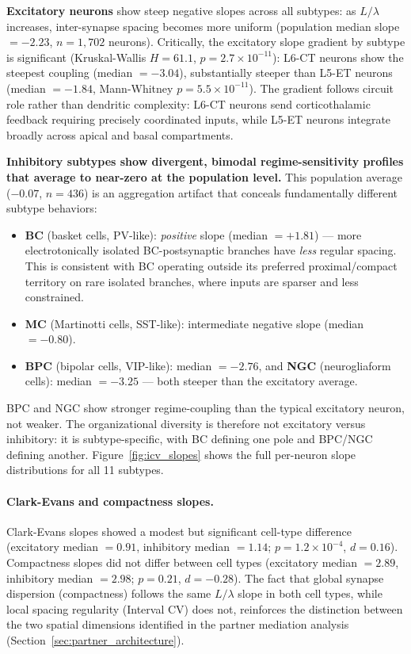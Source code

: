 \documentclass[11pt]{article}
\begin{document}
\textbf{Excitatory neurons} show steep negative slopes across all subtypes: as $L/\lambda$ increases, inter-synapse spacing becomes more uniform (population median slope $= -2.23$, $n = 1{,}702$ neurons). Critically, the excitatory slope gradient by subtype is significant (Kruskal-Wallis $H = 61.1$, $p = 2.7 \times 10^{-11}$): L6-CT neurons show the steepest coupling (median $= -3.04$), substantially steeper than L5-ET neurons (median $= -1.84$, Mann-Whitney $p = 5.5 \times 10^{-11}$). The gradient follows circuit role rather than dendritic complexity: L6-CT neurons send corticothalamic feedback requiring precisely coordinated inputs, while L5-ET neurons integrate broadly across apical and basal compartments.

\textbf{Inhibitory subtypes show divergent, bimodal regime-sensitivity profiles that average to near-zero at the population level.} This population average ($-0.07$, $n = 436$) is an aggregation artifact that conceals fundamentally different subtype behaviors:
\begin{itemize}
  \item \textbf{BC} (basket cells, PV-like): \textit{positive} slope (median $= +1.81$) --- more electrotonically isolated BC-postsynaptic branches have \textit{less} regular spacing. This is consistent with BC operating outside its preferred proximal/compact territory on rare isolated branches, where inputs are sparser and less constrained.
  \item \textbf{MC} (Martinotti cells, SST-like): intermediate negative slope (median $= -0.80$).
  \item \textbf{BPC} (bipolar cells, VIP-like): median $= -2.76$, and \textbf{NGC} (neurogliaform cells): median $= -3.25$ --- both steeper than the excitatory average.
\end{itemize}

BPC and NGC show stronger regime-coupling than the typical excitatory neuron, not weaker. The organizational diversity is therefore not excitatory versus inhibitory: it is subtype-specific, with BC defining one pole and BPC/NGC defining another. Figure~\ref{fig:icv_slopes} shows the full per-neuron slope distributions for all 11 subtypes.

\paragraph{Clark-Evans and compactness slopes.} Clark-Evans slopes showed a modest but significant cell-type difference (excitatory median $= 0.91$, inhibitory median $= 1.14$; $p = 1.2 \times 10^{-4}$, $d = 0.16$). Compactness slopes did not differ between cell types (excitatory median $= 2.89$, inhibitory median $= 2.98$; $p = 0.21$, $d = -0.28$). The fact that global synapse dispersion (compactness) follows the same $L/\lambda$ slope in both cell types, while local spacing regularity (Interval CV) does not, reinforces the distinction between the two spatial dimensions identified in the partner mediation analysis (Section~\ref{sec:partner_architecture}).
\end{document}
